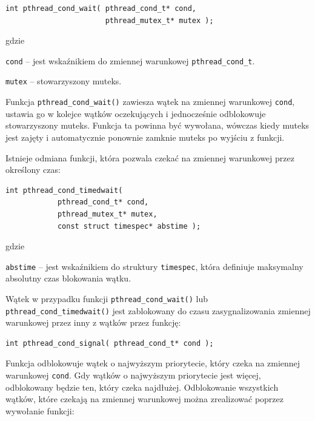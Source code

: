 \begin{lstlisting}[style=MyCStyle]
int pthread_cond_wait( pthread_cond_t* cond,
                       pthread_mutex_t* mutex );
\end{lstlisting}

gdzie 

\begin{myitemize}
\item \lstinline[style=MyCStyle]{cond} -- jest wskaźnikiem do zmiennej warunkowej \lstinline[style=MyCStyle]{pthread_cond_t}.
\item \lstinline[style=MyCStyle]{mutex} -- stowarzyszony muteks. 
\end{myitemize}

Funkcja \lstinline[style=MyCStyle]{pthread_cond_wait()} zawiesza wątek na zmiennej warunkowej \lstinline[style=MyCStyle]{cond}, ustawia go w kolejce wątków oczekujących i jednocześnie odblokowuje stowarzyszony muteks. Funkcja ta powinna być wywołana, wówczas kiedy muteks jest zajęty i automatycznie ponownie zamknie muteks po wyjściu z funkcji. 

Istnieje odmiana funkcji, która pozwala czekać na zmiennej warunkowej przez określony czas:

\begin{lstlisting}[style=MyCStyle]
int pthread_cond_timedwait(
            pthread_cond_t* cond,
            pthread_mutex_t* mutex,
            const struct timespec* abstime );
\end{lstlisting}

gdzie 
\begin{myitemize}
\item \lstinline[style=MyCStyle]{abstime} -- jest wskaźnikiem do struktury \lstinline[style=MyCStyle]{timespec}, która definiuje maksymalny absolutny czas blokowania wątku.
\end{myitemize}

Wątek w przypadku funkcji \lstinline[style=MyCStyle]{pthread_cond_wait()} lub \lstinline[style=MyCStyle]{pthread_cond_timedwait()} jest zablokowany do czasu zasygnalizowania zmiennej warunkowej przez  inny z wątków przez funkcję: 

\begin{lstlisting}[style=MyCStyle]
int pthread_cond_signal( pthread_cond_t* cond );
\end{lstlisting}

Funkcja odblokowuje wątek o najwyższym priorytecie, który czeka na zmiennej warunkowej \lstinline[style=MyCStyle]{cond}. Gdy wątków o najwyższym priorytecie jest więcej, odblokowany będzie ten, który czeka najdłużej. Odblokowanie wszystkich wątków, które czekają na zmiennej warunkowej można zrealizować poprzez wywołanie funkcji: 

